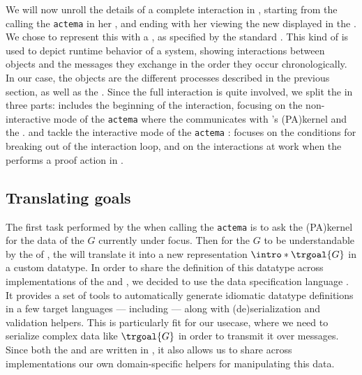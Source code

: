 \AP
We will now unroll the details of a complete interaction in ,
starting from the  calling the \texttt{actema}  in her
, and ending with her viewing the new  displayed in
the . We chose to represent this with a ,
as specified by the  standard \cite{enwiki:1153944336}. This kind of
 is used to depict runtime behavior of a system, showing
interactions between objects and the messages they exchange in the order they
occur chronologically. In our case, the objects are the different processes
described in the previous section, as well as the . Since the full
interaction is quite involved, we split the  in three parts:
 includes the beginning of the interaction, focusing on the
non-interactive mode of the \texttt{actema}  where the
 communicates with 's \kl(PA){kernel} and the
.  and  tackle the
interactive mode of the \texttt{actema} :  focuses
on the conditions for breaking out of the interaction loop, and
 on the interactions at work when the  performs
a proof action in .

\subsection{Translating goals}

\AP
The first task performed by the  when calling the
\texttt{actema}  is to ask the \kl(PA){kernel} for the data of the
 $G$ currently under focus. Then for the  $G$ to be
understandable by the  of , the 
will translate it into a new representation $\intro*\trgoal{G}$ in a custom datatype.
In order to share the definition of this datatype across implementations of the
 and , we decided to use the  data
specification language \cite{ATD}. It provides a set of tools to automatically
generate idiomatic datatype definitions in a few target languages --- including
 --- along with (de)serialization and validation helpers. This is
particularly fit for our usecase, where we need to serialize complex data like
$\trgoal{G}$ in order to transmit it over  messages. Since both the
 and  are written in , it also allows
us to share across implementations our own domain-specific helpers for
manipulating this data.


